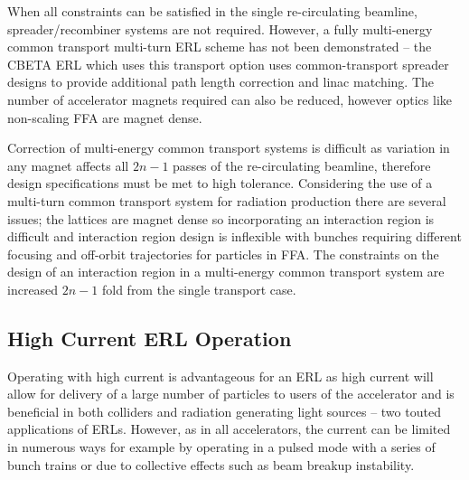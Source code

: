 \documentclass[../main.tex]{subfiles}
\begin{document}
When all constraints can be satisfied in the single re-circulating beamline, spreader/recombiner systems are not required. However, a fully multi-energy common transport multi-turn ERL scheme has not been demonstrated -- the CBETA ERL \cite{hoffstaetter2017cbeta,bartnik2020cbeta} which uses this transport option uses common-transport spreader designs to provide additional path length correction and linac matching. The number of accelerator magnets required can also be reduced, however optics like non-scaling FFA are magnet dense.

Correction of multi-energy common transport systems is difficult as variation in any magnet affects all $2n-1$ passes of the re-circulating beamline, therefore design specifications must be met to high tolerance. Considering the use of a multi-turn common transport system for radiation production there are several issues; the lattices are magnet dense so incorporating an interaction region is difficult and interaction region design is inflexible with bunches requiring different focusing and off-orbit trajectories for particles in FFA. The constraints on the design of an interaction region in a multi-energy common transport system are increased $2n-1$ fold from the single transport case.   

\subsection{High Current ERL Operation}

Operating with high current is advantageous for an ERL as high current will allow for delivery of a large number of particles to users of the accelerator and is beneficial in both colliders and radiation generating light sources -- two touted applications of ERLs. However, as in all accelerators, the current can be limited in numerous ways for example by operating in a pulsed mode with a series of bunch trains or due to collective effects such as beam breakup instability. 
\end{document}

